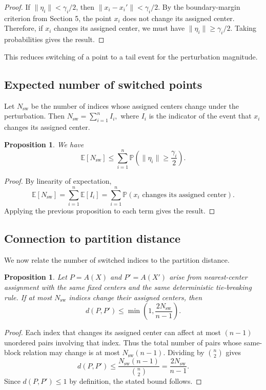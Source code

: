 \documentclass[11pt]{amsart}
\theoremstyle{plain}
\newtheorem{proposition}[subsection]{Proposition}
\theoremstyle{definition}
\begin{document}
\begin{proof}
If $\|\eta_i\| < \gamma_i/2$, then $\|x_i - x_i'\| < \gamma_i/2$. By the boundary-margin criterion from Section 5, the point $x_i$ does not change its assigned center. Therefore, if $x_i$ changes its assigned center, we must have $\|\eta_i\| \ge \gamma_i/2$. Taking probabilities gives the result.
\end{proof}

This reduces switching of a point to a tail event for the perturbation magnitude.

\subsection{Expected number of switched points}

Let $N_{\mathrm{sw}}$ be the number of indices whose assigned centers change under the perturbation. Then
$N_{\mathrm{sw}} = \sum_{i=1}^n I_i,$
where $I_i$ is the indicator of the event that $x_i$ changes its assigned center.

\begin{proposition}
We have
\[
\mathbb{E}[N_{\mathrm{sw}}] \le \sum_{i=1}^n 
\mathbb{P}\!\left( \|\eta_i\| \ge \frac{\gamma_i}{2} \right).
\]
\end{proposition}

\begin{proof}
By linearity of expectation,
\[
\mathbb{E}[N_{\mathrm{sw}}] = \sum_{i=1}^n \mathbb{E}[I_i] 
= \sum_{i=1}^n \mathbb{P}(\text{$x_i$ changes its assigned center}).
\]
Applying the previous proposition to each term gives the result.
\end{proof}

\subsection{Connection to partition distance}

We now relate the number of switched indices to the partition distance.

\begin{proposition}
Let $P = A(X)$ and $P' = A(X')$ arise from nearest-center assignment with the same fixed centers and the same deterministic tie-breaking rule. If at most $N_{\mathrm{sw}}$ indices change their assigned centers, then
\[
d(P, P') \le \min\!\left(1, \frac{2N_{\mathrm{sw}}}{n-1}\right).
\]
\end{proposition}

\begin{proof}
Each index that changes its assigned center can affect at most $(n-1)$ unordered pairs involving that index. Thus the total number of pairs whose same-block relation may change is at most $N_{\mathrm{sw}}(n-1)$. Dividing by $\binom{n}{2}$ gives
\[
d(P, P') \le \frac{N_{\mathrm{sw}}(n-1)}{\binom{n}{2}} 
= \frac{2N_{\mathrm{sw}}}{n-1}.
\]
Since $d(P,P') \le 1$ by definition, the stated bound follows.
\end{proof}
\end{document}
